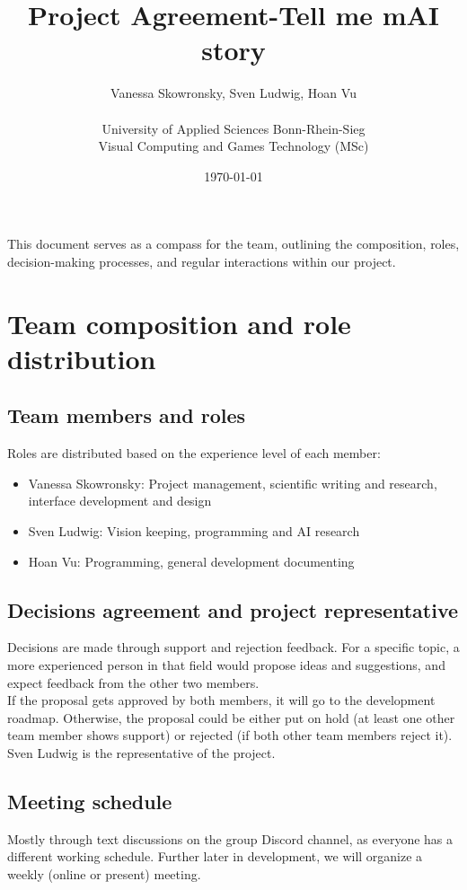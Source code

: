 \documentclass{article}
\title{Project Agreement-Tell me mAI story}
\author{Vanessa Skowronsky, Sven Ludwig, Hoan Vu \\\\ University of Applied Sciences Bonn-Rhein-Sieg \\ Visual Computing and Games Technology (MSc)}
\date{\today}
\begin{document}
\maketitle

This document serves as a compass for the team, outlining the composition, roles, decision-making processes, and regular interactions within our project.
\section{Team composition and role distribution}
\subsection{Team members and roles}
Roles are distributed based on the experience level of each member: 
\begin{itemize}
    \item Vanessa Skowronsky: Project management, scientific writing and research, interface development and design
    \item Sven Ludwig: Vision keeping, programming and AI research
    \item Hoan Vu: Programming, general development documenting
\end{itemize}

\subsection{Decisions agreement and project representative}
Decisions are made through support and rejection feedback. For a specific topic, a more experienced person in that field would propose ideas and suggestions, and expect feedback from the other two members. \\

If the proposal gets approved by both members, it will go to the development roadmap. Otherwise, the proposal could be either put on hold (at least one other team member shows support) or rejected (if both other team members reject it).\\

Sven Ludwig is the representative of the project.
\subsection{Meeting schedule}
Mostly through text discussions on the group Discord channel, as everyone has a different working schedule. Further later in development, we will organize a weekly (online or present) meeting.
\end{document}
